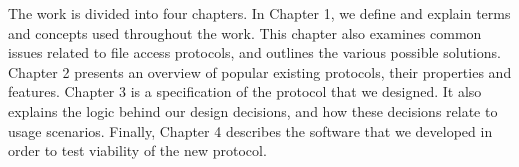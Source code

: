 The work is divided into four chapters. In Chapter 1, we define and explain terms and concepts used throughout
the work. This chapter also examines common issues related to file access protocols, and outlines the various
possible solutions. Chapter 2 presents an overview of popular existing protocols, their properties and
features. Chapter 3 is a specification of the protocol that we designed. It also explains the logic behind our
design decisions, and how these decisions relate to usage scenarios. Finally, Chapter 4 describes the software
that we developed in order to test viability of the new protocol.
